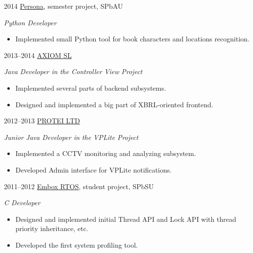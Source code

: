 \documentclass[]{friggeri-cv} %
\begin{document}
\begin{entrylist}
\entry
{2014}
{\href{https://github.com/nunberty/chars-movement-graph}{Persona}, semester project, SPbAU}
{}
{\emph{Python Developer}
    \begin{itemize}
        \item
        Implemented small Python tool for book characters and locations recognition.
    \end{itemize}
}
\entry
{2013--2014}
{\href{http://axiomsl.com}{AXIOM SL}}
{}
{\emph{Java Developer in the Controller View Project}

    \begin{itemize}
    \item
        Implemented several parts of backend subsystems.
    \item
        Designed and implemented
        a big part of XBRL-oriented frontend.
    \end{itemize}
}
\entry
{2012--2013}
{\href{http://protei.com}{PROTEI LTD}}
{}
{\emph{Junior Java Developer in the VPLite Project}
    \begin{itemize}
        \item
        Implemented a CCTV monitoring and analyzing subsystem.
        \item
        Developed Admin interface for VPLite notifications.
    \end{itemize}
}
\entry
{2011--2012}
{\href{https://code.google.com/p/embox}{Embox RTOS}, student project, SPbSU}
{}
{\emph{C Developer}
    \begin{itemize}
        \item
        Designed and implemented initial Thread API and Lock API with thread priority inheritance, etc.
        \item
        Developed the first system profiling tool.
    \end{itemize}
}
\end{entrylist}

%
\end{document}
